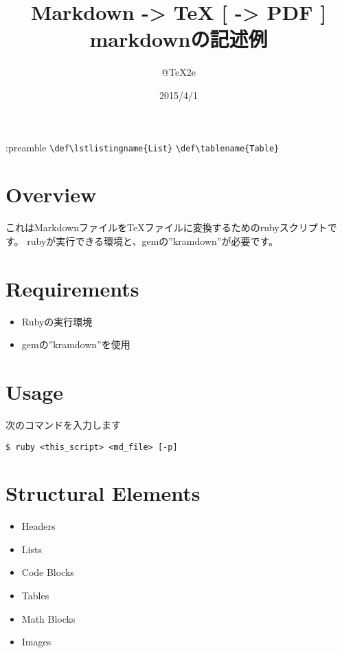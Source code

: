 \documentclass[a4j, titlepage]{jarticle}
\title{ \Huge Markdown -\textgreater{} TeX [ -\textgreater{} PDF ] \\{\LARGE markdownの記述例}}
\author{ \Large @TeX2e }
\date{ \Large 2015/4/1 }
\begin{document}
\maketitle
\thispagestyle{empty}
\newpage
\setcounter{page}{1}

:preamble
	{\tt \textbackslash{}def\textbackslash{}lstlistingname\{List\}}
	{\tt \textbackslash{}def\textbackslash{}tablename\{Table\}}

\fi
\section{Overview}

これはMarkdownファイルをTeXファイルに変換するためのrubyスクリプトです。
rubyが実行できる環境と、gemの''kramdown''が必要です。

\section{Requirements}

\begin{itemize}
\item Rubyの実行環境
\item gemの''kramdown''を使用
\end{itemize}

\section{Usage}

次のコマンドを入力します

\begin{screen}
\begin{verbatim}
$ ruby <this_script> <md_file> [-p]
\end{verbatim}
\end{screen}

\section{Structural Elements}

\begin{itemize}
\item Headers
\item Lists
\item Code Blocks
\item Tables
\item Math Blocks
\item Images
\end{itemize}
\end{document}
